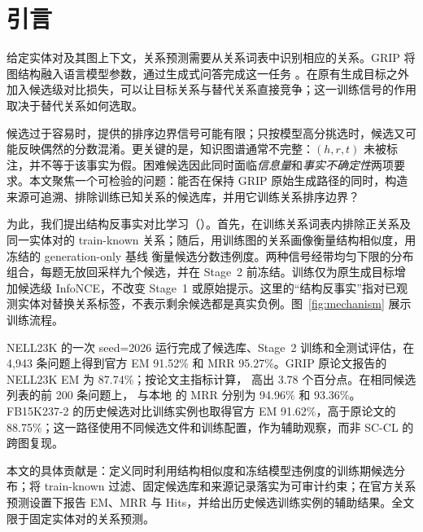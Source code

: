 \section{引言}

给定实体对及其图上下文，关系预测需要从关系词表中识别相应的关系。GRIP 将图结构融入语言模型参数，通过生成式问答完成这一任务 \citep{feng2025grip}。在原有生成目标之外加入候选级对比损失，可以让目标关系与替代关系直接竞争；这一训练信号的作用取决于替代关系如何选取。

候选过于容易时，提供的排序边界信号可能有限；只按模型高分挑选时，候选又可能反映偶然的分数混淆。更关键的是，知识图谱通常不完整：$(h,r,t)$ 未被标注，并不等于该事实为假。困难候选因此同时面临\emph{信息量}和\emph{事实不确定性}两项要求。本文聚焦一个可检验的问题：能否在保持 GRIP 原始生成路径的同时，构造来源可追溯、排除训练已知关系的候选库，并用它训练关系排序边界？

为此，我们提出结构反事实对比学习（\scc）。首先，在训练关系词表内排除正关系及同一实体对的 train-known 关系；随后，用训练图的关系画像衡量结构相似度，用冻结的 generation-only 基线 \bone{} 衡量候选分数违例度。两种信号经带均匀下限的分布组合，每题无放回采样九个候选，并在 Stage~2 前冻结。训练仅为原生成目标增加候选级 InfoNCE，不改变 Stage~1 或原始提示。这里的“结构反事实”指对已观测实体对替换关系标签，不表示剩余候选都是真实负例。图~\ref{fig:mechanism} 展示训练流程。

NELL23K 的一次 seed=2026 运行完成了候选库、Stage~2 训练和全测试评估，在 4,943 条问题上得到官方 EM 91.52\% 和 MRR 95.27\%。GRIP 原论文报告的 NELL23K EM 为 87.74\%；按论文主指标计算，\scc{} 高出 3.78 个百分点。在相同候选列表的前 200 条问题上，\scc{} 与本地 \bone{} 的 MRR 分别为 94.96\% 和 93.36\%。FB15K237-2 的历史候选对比训练实例也取得官方 EM 91.62\%，高于原论文的 88.75\%；这一路径使用不同候选文件和训练配置，作为辅助观察，而非 SC-CL 的跨图复现。

本文的具体贡献是：定义同时利用结构相似度和冻结模型违例度的训练期候选分布；将 train-known 过滤、固定候选库和来源记录落实为可审计约束；在官方关系预测设置下报告 EM、MRR 与 Hits，并给出历史候选训练实例的辅助结果。全文限于固定实体对的关系预测。

